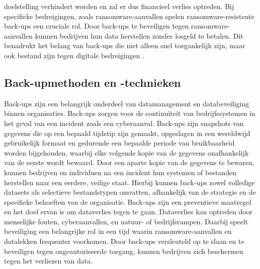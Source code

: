 doelstelling verhindert worden en zal er dus financieel verlies optreden. Bij specifieke bedreigingen, zoals ransomware-aanvallen spelen ransomware-resistente back-ups een cruciale rol. Door back-ups te beveiligen tegen ransomware-aanvallen kunnen bedrijven hun data herstellen zonder losgeld te betalen. Dit benadrukt het belang van back-ups die niet alleen snel toegankelijk zijn, maar ook bestand zijn tegen digitale bedreigingen \autocite{Ghazi2013}.

\subsection{Back-upmethoden en -technieken}
Back-ups zijn een belangrijk onderdeel van datamanagement en databeveiliging binnen organisaties. Back-ups zorgen voor de continuïteit van bedrijfssystemen in het geval van een incident zoals een cyberaanval. Back-ups zijn snapshots van gegevens die op een bepaald tijdstip zijn gemaakt, opgeslagen in een wereldwijd gebruikelijk formaat en gedurende een bepaalde periode van bruikbaarheid worden bijgehouden, waarbij elke volgende kopie van de gegevens onafhankelijk van de eerste wordt bewaard\autocite{Nelson2011}. Door een aparte kopie van de gegevens te bewaren, kunnen bedrijven en individuen na een incident hun systemen of bestanden herstellen naar een eerdere, veilige staat. Hierbij kunnen back-ups zowel volledige datasets als selectieve bestandstypen omvatten, afhankelijk van de strategie en de specifieke behoeften van de organisatie. Back-ups zijn een preventieve maatregel en het doel ervan is om dataverlies tegen te gaan. Dataverlies kan optreden door menselijke fouten, cyberaanvallen, en natuur- of bedrijfsrampen. Daarbij speelt beveiliging een belangrijke rol in een tijd waarin ransomware-aanvallen en datalekken frequenter voorkomen. Door back-ups versleuteld op te slaan en te beveiligen tegen ongeautoriseerde toegang, kunnen bedrijven zich beschermen tegen het verliezen van data. 
